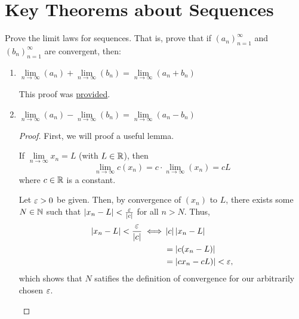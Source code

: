 \section{Key Theorems about Sequences}

\begin{problem}
Prove the limit laws for sequences. That is, prove that if
$(a_{n})_{n=1}^{\infty}$ and $(b_{n})_{n=1}^{\infty}$ are convergent, then:

  \begin{enumerate}[label=(\alph*)]
    \item $\lim\limits_{n \to \infty} {(a_{n})} + \lim\limits_{n \to \infty} {(b_{n})} = \lim\limits_{n \to \infty} {(a_{n} + b_{n})}$
      \label{prob:sum-limit-law}

      \begin{callout}
        This proof was \href{https://www.youtube.com/watch?v=Q7MzeAaL7bU&t=610s}{provided}.
      \end{callout}


    \item $\lim\limits_{n \to \infty} {(a_{n})} - \lim\limits_{n \to \infty} {(b_{n})} = \lim\limits_{n \to \infty} {(a_{n} - b_{n})}$

      \begin{proof}
        First, we will proof a useful lemma.

        \begin{lemma}
          \label{lem:constant-multiplication-limit-law}
          If $\lim\limits_{n \to \infty} x_{n} = L$ (with $L \in \mathbb{R}$), then 
          \[
            \lim\limits_{n \to \infty} c(x_{n}) = c \cdot \lim\limits_{n \to \infty} (x_{n}) = c L
          \]
          where $c \in \mathbb{R}$ is a constant.
        \end{lemma}

        \begin{subproof}
          Let $\varepsilon > 0$ be given. Then, by convergence of $(x_{n})$ to $L$, there exists
          some $N \in \mathbb{N}$ such that $\left\lvert x_{n} - L \right\rvert < \frac{\varepsilon}{\left\lvert c \right\rvert}$ for all $n > N$.
          Thus, 
          \begin{align*}
            \left\lvert x_{n} - L \right\rvert < \frac{\varepsilon}{\left\lvert c \right\rvert} \iff & \left\lvert c \right\rvert\left\lvert x_{n} - L \right\rvert \\
                                                        &= \left\lvert c(x_{n} - L) \right\rvert \\
                                                        &= \left\lvert cx_{n} - cL) \right\rvert < \varepsilon,
          \end{align*}
          which shows that $N$ satifies the definition of convergence for our arbitrarily chosen 
          $\varepsilon$.
        \end{subproof}


\end{proof}
\end{enumerate}
\end{problem}
